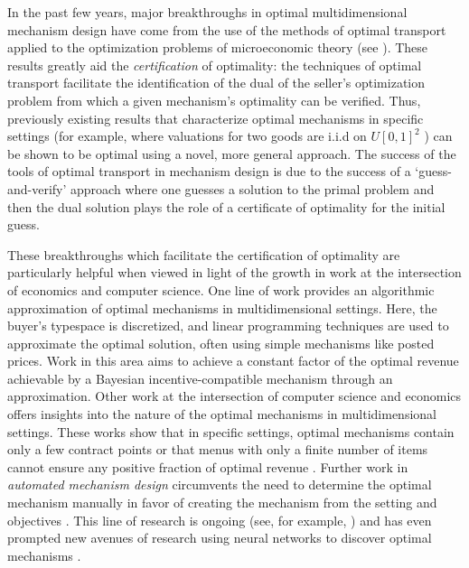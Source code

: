 \documentclass{article}
\begin{document}
In the past few years, major breakthroughs in optimal multidimensional mechanism design have come from the use of the methods of optimal transport applied to the optimization problems of microeconomic theory (see \cite{ekeland2010}). These results \autocite{daskalakis2017strong, kolesnikov2022} greatly aid the \textit{certification} of optimality: the techniques of optimal transport facilitate the identification of the dual of the seller's optimization problem from which a given mechanism's optimality can be verified. Thus, previously existing results that characterize optimal mechanisms in specific settings (for example, where valuations for two goods are i.i.d on $U[0,1]^2$ \autocite{pavlov2011optimal, manelli2006}) can be shown to be optimal using a novel, more general approach. The success of the tools of optimal transport in mechanism design is due to the success of a `guess-and-verify' approach where one guesses a solution to the primal problem and then the dual solution plays the role of a certificate of optimality for the initial guess.

These breakthroughs which facilitate the certification of optimality are particularly helpful when viewed in light of the growth in work at the intersection of economics and computer science. One line of work \autocite{chawla2007,cai2012,cai2016,belloni2010multidimensional,alaei2019efficient} provides an algorithmic approximation of optimal mechanisms in multidimensional settings. Here, the buyer's typespace is discretized, and linear programming techniques are used to approximate the optimal solution, often using simple mechanisms like posted prices. Work in this area aims to achieve a constant factor of the optimal revenue achievable by a Bayesian incentive-compatible mechanism through an approximation. Other work at the intersection of computer science and economics offers insights into the nature of the optimal mechanisms in multidimensional settings. These works show that in specific settings, optimal mechanisms contain only a few contract points \autocite{wang2014optimal} or that menus with only a finite number of items cannot ensure any positive fraction of optimal revenue \autocite{hart2019}. Further work in \textit{automated mechanism design} circumvents the need to determine the optimal mechanism manually in favor of creating the mechanism from the setting and objectives \autocite{conitzer2002,conitzer2004}. This line of research is ongoing (see, for example, \cite{conitzer2021}) and has even prompted new avenues of research using neural networks to discover optimal mechanisms \autocite{dutting2024}.
\end{document}
